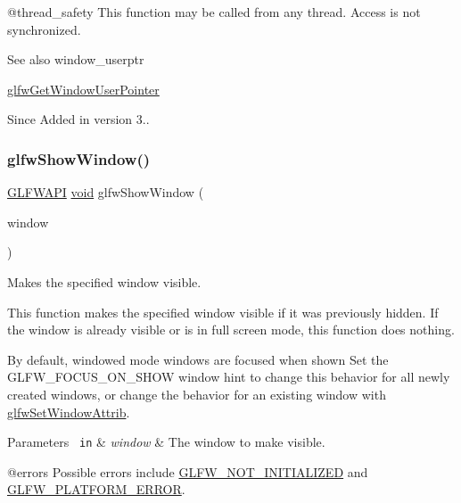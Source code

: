 @thread\+\_\+safety This function may be called from any thread. Access is not synchronized.

\begin{DoxySeeAlso}{See also}
window\+\_\+userptr 

\mbox{\hyperlink{group__window_ga0a9ff3b4bf8589e9518e8816d06a8f50}{glfw\+Get\+Window\+User\+Pointer}}
\end{DoxySeeAlso}
\begin{DoxySince}{Since}
Added in version 3.. 
\end{DoxySince}
\mbox{\label{group__window_ga7945bcdff9e5e058cf36505d6873ed8c}} 
\subsubsection{\texorpdfstring{glfwShowWindow()}{glfwShowWindow()}}
{\footnotesize\ttfamily \mbox{\hyperlink{glfw3_8h_a56da5036b2cc259351ae22fd6439bb47}{G\+L\+F\+W\+A\+PI}} \mbox{\hyperlink{glad_8h_a950fc91edb4504f62f1c577bf4727c29}{void}} glfw\+Show\+Window (\begin{DoxyParamCaption}\item[{\mbox{\hyperlink{group__window_ga3c96d80d363e67d13a41b5d1821f3242}{G\+L\+F\+Wwindow}} $\ast$}]{window }\end{DoxyParamCaption})}



Makes the specified window visible. 

This function makes the specified window visible if it was previously hidden. If the window is already visible or is in full screen mode, this function does nothing.

By default, windowed mode windows are focused when shown Set the G\+L\+F\+W\+\_\+\+F\+O\+C\+U\+S\+\_\+\+O\+N\+\_\+\+S\+H\+OW window hint to change this behavior for all newly created windows, or change the behavior for an existing window with \mbox{\hyperlink{group__window_gad39f43f07856efcf3d656426a9284c75}{glfw\+Set\+Window\+Attrib}}.


\begin{DoxyParams}[1]{Parameters}
\mbox{\texttt{ in}}  & {\em window} & The window to make visible.\\
\hline
\end{DoxyParams}
@errors Possible errors include \mbox{\hyperlink{group__errors_ga2374ee02c177f12e1fa76ff3ed15e14a}{G\+L\+F\+W\+\_\+\+N\+O\+T\+\_\+\+I\+N\+I\+T\+I\+A\+L\+I\+Z\+ED}} and \mbox{\hyperlink{group__errors_gad44162d78100ea5e87cdd38426b8c7a1}{G\+L\+F\+W\+\_\+\+P\+L\+A\+T\+F\+O\+R\+M\+\_\+\+E\+R\+R\+OR}}.

